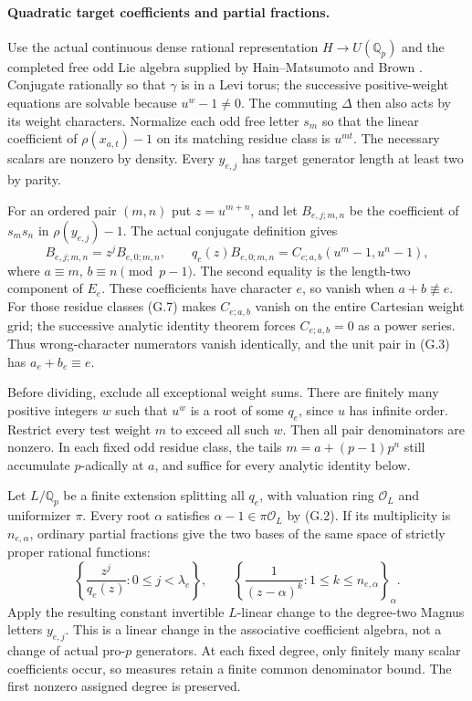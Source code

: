 \documentclass[11pt,a4paper]{article}
\theoremstyle{definition}
\begin{document}
\paragraph{Quadratic target coefficients and partial fractions.}
Use the actual continuous dense rational representation $H\to U(\mathbb Q_p)$ and the completed free odd Lie algebra supplied by Hain--Matsumoto and Brown \cite{HainMatsumoto2001,Brown2019}. Conjugate rationally so that $\gamma$ is in a Levi torus; the successive positive-weight equations are solvable because $u^w-1\ne0$. The commuting $\Delta$ then also acts by its weight characters. Normalize each odd free letter $s_m$ so that the linear coefficient of $\rho(x_{a,t})-1$ on its matching residue class is $u^{mt}$. The necessary scalars are nonzero by density. Every $y_{e,j}$ has target generator length at least two by parity.

For an ordered pair $(m,n)$ put $z=u^{m+n}$, and let $B_{e,j;m,n}$ be the coefficient of $s_ms_n$ in $\rho(y_{e,j})-1$. The actual conjugate definition gives
\[
 B_{e,j;m,n}=z^jB_{e,0;m,n},
 \qquad
 q_e(z)B_{e,0;m,n}=C_{e;a,b}(u^m-1,u^n-1),                    \tag{G.7}
\]
where $a\equiv m$, $b\equiv n\pmod{p-1}$. The second equality is the length-two component of $E_e$. These coefficients have character $e$, so vanish when $a+b\not\equiv e$. For those residue classes (G.7) makes $C_{e;a,b}$ vanish on the entire Cartesian weight grid; the successive analytic identity theorem forces $C_{e;a,b}=0$ as a power series. Thus wrong-character numerators vanish identically, and the unit pair in (G.3) has $a_e+b_e\equiv e$.

Before dividing, exclude all exceptional weight sums. There are finitely many positive integers $w$ such that $u^w$ is a root of some $q_e$, since $u$ has infinite order. Restrict every test weight $m$ to exceed all such $w$. Then all pair denominators are nonzero. In each fixed odd residue class, the tails $m=a+(p-1)p^n$ still accumulate $p$-adically at $a$, and suffice for every analytic identity below.

Let $L/\mathbb Q_p$ be a finite extension splitting all $q_e$, with valuation ring $\mathcal O_L$ and uniformizer $\pi$. Every root $\alpha$ satisfies $\alpha-1\in\pi\mathcal O_L$ by (G.2). If its multiplicity is $n_{e,\alpha}$, ordinary partial fractions give the two bases of the same space of strictly proper rational functions:
\[
 \left\{\frac{z^j}{q_e(z)}:0\le j<\lambda_e\right\},
 \qquad
 \left\{\frac1{(z-\alpha)^k}:1\le k\le n_{e,\alpha}\right\}_{\alpha}.
\]
Apply the resulting constant invertible $L$-linear change to the degree-two Magnus letters $y_{e,j}$. This is a linear change in the associative coefficient algebra, not a change of actual pro-$p$ generators. At each fixed degree, only finitely many scalar coefficients occur, so measures retain a finite common denominator bound. The first nonzero assigned degree is preserved.
\end{document}

